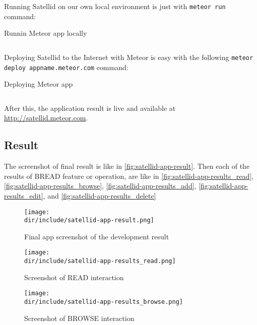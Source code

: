 Running Satellid on our own local environment is just with \verb|meteor run| command:

\begin{listing}[!h]
\caption{Runnin Meteor app locally}
\inputminted{shell-session}{\dir/include/satellid-meteor-run.shell-session}
\label{lst:satellid-run}
\end{listing}

Deploying Satellid to the Internet with Meteor is easy with the following \verb|meteor deploy appname.meteor.com| command:

\begin{listing}[!h]
\caption{Deploying Meteor app}
\inputminted{shell-session}{\dir/include/satellid-meteor-deploy.shell-session}
\label{lst:satellid-deploy}
\end{listing}

After this, the application result is live and available at \url{http://satellid.meteor.com}.

\subsection{Result}

The screenshot of final result is like in \autoref{fig:satellid-app-result}.
Then each of the results of \ac{BREAD} feature or operation, are like in
\autoref{fig:satellid-app-results_read},
\autoref{fig:satellid-app-results_browse},
\autoref{fig:satellid-app-results_add},
\autoref{fig:satellid-app-results_edit}, and
\autoref{fig:satellid-app-results_delete}

\begin{figure}[!htp]
  \centering
  \texttt{[image: \\dir/include/satellid-app-result.png]}
  \caption{Final app screenshot of the development result}
  \label{fig:satellid-app-result}
\end{figure}

\begin{figure}[!htp]
  \centering
  \texttt{[image: \\dir/include/satellid-app-results\_read.png]}
  \caption{Screenshot of READ interaction}
  \label{fig:satellid-app-results_read}
\end{figure}

\begin{figure}[!htp]
  \centering
  \texttt{[image: \\dir/include/satellid-app-results\_browse.png]}
  \caption{Screenshot of BROWSE interaction}
  \label{fig:satellid-app-results_browse}
\end{figure}

